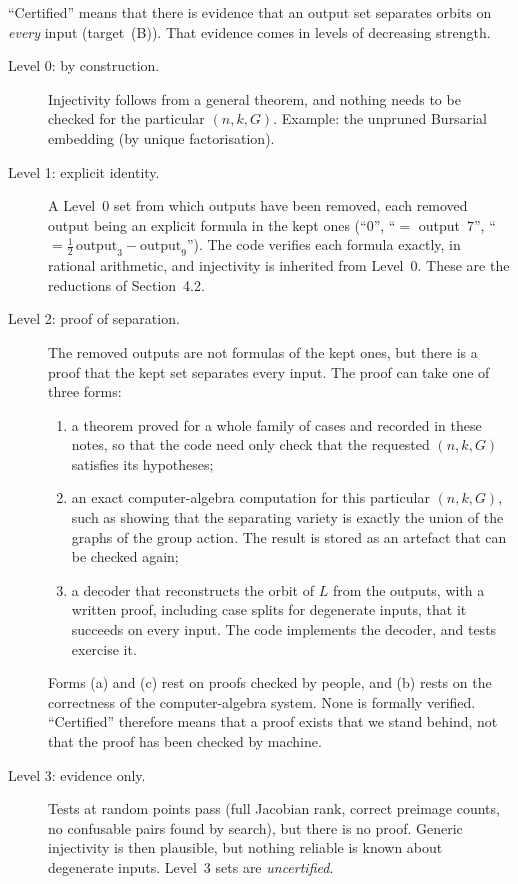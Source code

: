 \documentclass[11pt]{article}
\theoremstyle{definition}
\theoremstyle{remark}
\begin{document}
``Certified'' means that there is evidence that an output set separates
orbits on \emph{every} input (target~(B)). That evidence comes in levels of
decreasing strength.
\begin{description}
  \item[Level 0: by construction.] Injectivity follows from a general theorem,
    and nothing needs to be checked for the particular $(n, k, G)$. Example:
    the unpruned Bursarial embedding (by unique factorisation).
  \item[Level 1: explicit identity.] A Level~0 set from which outputs have
    been removed, each removed output being an explicit formula in the kept
    ones (``$0$'', ``$=$ output~$7$'', ``$= \tfrac12\,\text{output}_3 -
    \text{output}_9$''). The code verifies each formula exactly, in rational
    arithmetic, and injectivity is inherited from Level~0. These are the
    reductions of Section~4.2.
  \item[Level 2: proof of separation.] The removed outputs are not formulas
    of the kept ones, but there is a proof that the kept set separates every
    input. The proof can take one of three forms:
    \begin{enumerate}
      \item[(a)] a theorem proved for a whole family of cases and recorded in
        these notes, so that the code need only check that the requested
        $(n, k, G)$ satisfies its hypotheses;
      \item[(b)] an exact computer-algebra computation for this particular
        $(n, k, G)$, such as showing that the separating variety is exactly
        the union of the graphs of the group action. The result is stored as
        an artefact that can be checked again;
      \item[(c)] a decoder that reconstructs the orbit of $L$ from the
        outputs, with a written proof, including case splits for degenerate
        inputs, that it succeeds on every input. The code implements the
        decoder, and tests exercise it.
    \end{enumerate}
    Forms (a) and (c) rest on proofs checked by people, and (b) rests on the
    correctness of the computer-algebra system. None is formally verified.
    ``Certified'' therefore means that a proof exists that we stand behind,
    not that the proof has been checked by machine.
  \item[Level 3: evidence only.] Tests at random points pass (full Jacobian
    rank, correct preimage counts, no confusable pairs found by search), but
    there is no proof. Generic injectivity is then plausible, but nothing
    reliable is known about degenerate inputs. Level~3 sets are
    \emph{uncertified}.
\end{description}
\end{document}
